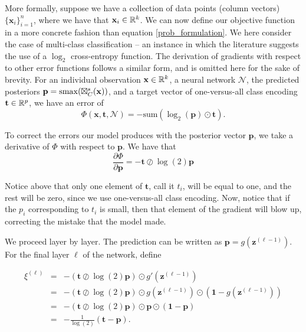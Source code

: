 More formally, suppose we have a collection of data points (column vectors) $\{\mathbf{x}_i\}_{i=1}^n$, where we have that $\mathbf{x}_i\in\mathbb{R}^k$. We can now define our objective function in a more concrete fashion than equation \eqref{prob_formulation}. We here consider the case of multi-class classification -- an instance in which the literature suggests the use of a $\log_2$ cross-entropy function. The derivation of gradients with respect to other error functions follows a similar form, and is omitted here for the sake of brevity. For an individual observation $\mathbf{x}\in\mathbb{R}^k$, a neural network $\mathcal{N}$, the predicted posteriors $\mathbf{p} = \mathrm{smax}(\boxtimes_{C}^{s}(\mathbf{x}))$, and a target vector of one-versus-all class encoding $\mathbf{t}\in\mathbb{R}^p$, we have an error of 
\begin{equation}
\Phi(\mathbf{x}, \mathbf{t}, \mathcal{N}) = -\text{sum}(\log_2(\mathbf{p}) \odot \mathbf{t}).
\end{equation}

To correct the errors our model produces with the posterior vector $\mathbf{p}$, we take a derivative of $\Phi$ with respect to $\mathbf{p}$. We have that 
\begin{equation}
\label{eq:ce_error}
\frac{\partial\Phi}{\partial\mathbf{p}} = -\mathbf{t} \oslash \log(2)\mathbf{p}
\end{equation}

Notice above that only one element of $\mathbf{t}$, call it $t_i$, will be equal to one, and the rest will be zero, since we use one-versus-all class encoding. Now, notice that if the $p_i$ corresponding to $t_i$ is small, then that element of the gradient will blow up, correcting the mistake that the model made. 

We proceed layer by layer. The prediction can be written as $\mathbf{p} = g(\mathbf{z}^{(\ell-1)})$. For the final layer $\ell$ of the network, define

\begin{eqnarray}
\label{eq:finallayer}
\xi^{(\ell)} &=& -(\mathbf{t} \oslash \log(2)\mathbf{p}) \odot g'(\mathbf{z}^{(\ell-1)})\\
 &=& - (\mathbf{t} \oslash \log(2) \mathbf{p}) \odot g(\mathbf{z}^{(\ell-1)}) \odot (\mathbf{1} - g(\mathbf{z}^{(\ell-1)}))\\
 &=& -(\mathbf{t} \oslash \log(2)\mathbf{p}) \odot \mathbf{p} \odot (\mathbf{1} - \mathbf{p})\\
 &=& -\frac{1}{\log(2)}(\mathbf{t} - \mathbf{p}).
\end{eqnarray}

